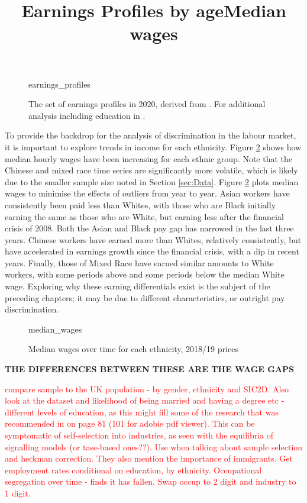 \documentclass[class=article, crop=false]{standalone}
\begin{document}
\begin{figure}[h]
\centering
    \title{Earnings Profiles by age}
    {earnings_profiles}
    \caption{The set of earnings profiles in 2020, derived from \citep{ONSc}. For additional analysis including education in \citep{Mincer}.}
    \label{fig:earnings_profiles}
\end{figure}

To provide the backdrop for the analysis of discrimination in the labour market, it is important to explore trends in income for each ethnicity. Figure \ref{fig:median_wages} shows how median hourly wages have been increasing for each ethnic group. Note that the Chinese and mixed race time series are significantly more volatile, which is likely due to the smaller sample size noted in Section \ref{sec:Data}. Figure \ref{fig:median_wages} plots median wages to minimise the effects of outliers from year to year. Asian workers have consistently been paid less than Whites, with those who are Black initially earning the same as those who are White, but earning less after the financial crisis of 2008. Both the Asian and Black pay gap has narrowed in the last three years. Chinese workers have earned more than Whites, relatively consistently, but have accelerated in earnings growth since the financial crisis, with a dip in recent years. Finally, those of Mixed Race have earned similar amounts to White workers, with some periods above and some periods below the median White wage. Exploring why these earning differentials exist is the subject of the preceding chapters; it may be due to different characteristics, or outright pay discrimination.

\begin{figure}[]
\centering
    \title{Median wages}
    {median_wages}
    \caption{Median wages over time for each ethnicity, 2018/19 prices}
    \label{fig:median_wages}
\end{figure}
\textbf{THE DIFFERENCES BETWEEN THESE ARE THE WAGE GAPS}

\textcolor{red}{compare sample to the UK population - by gender, ethnicity and SIC2D. Also look at the dataset and likelihood of being married and having a degree etc - different levels of education, as this might fill some of the research that was recommended in \citep{Longhi2} on page 81 (101 for adobie pdf viewer).
This can be symptomatic of self-selection into industries, as seen with the equilibria of signalling models (or tase-based ones??).
Use \citep{Shields} when talking about sample selection and heckman correction. They also mention the importance of immigrants.
Get employment rates conditional on education, by ethnicity.
Occupational segregation over time - \citep{Longhi3} finds it has fallen.
Swap occup to 2 digit and industry to 1 digit.}
\end{document}
